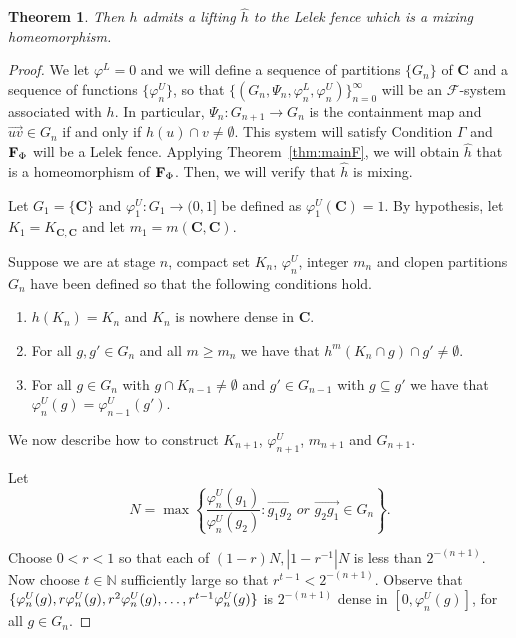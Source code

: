 \documentclass[11pt]{amsart}
\newtheorem{theorem}{Theorem}[section]
\newcommand{\N}{\mathbb{N}}  %
\newcommand{\oa}{\overrightarrow}
\newcommand{\cantor}{\mathbf C}
\newcommand{\fence}{{\bf F}_{\Phi}{}}
\newcommand{\cF}{\mathcal{F}}
\newcommand{\fsystem}{\{(G_n, \Psi_n,\varphi^L_n,\varphi^U_n)\}_{n=0}^{\infty}}
\begin{document}
{\begin{theorem}
Then $h$ admits a lifting $\hat{h}$ to the Lelek fence which is a mixing homeomorphism.
\end{theorem}
\begin{proof}
We let $\varphi^L=0$ and 
    we will define a sequence of partitions $\{G_n\}$  of $\cantor$ and a sequence of functions $\{\varphi^U_n\}$, so that $\fsystem$ will be an  $\cF$-system associated with $h$. In particular, $
    \Psi_n:G_{n+1} \rightarrow G_n$ is the  containment map and $ \oa{uv} \in G_n$ if and only if $h(u) \cap v \neq \emptyset$.  This system will satisfy Condition $\Gamma$ and $\fence$ will be a Lelek fence. Applying Theorem~\ref{thm:mainF}, we will obtain $\hat h$ that is a homeomorphism of $\fence$. Then, we will verify that $\hat{h}$ is mixing.

     Let $G_1= \{\cantor\}$ and $\varphi^U_1:G_1 \rightarrow (0,1]$ be defined as $\varphi^U_1(\cantor) =1$. By hypothesis, let $K_1=K_{\cantor,\cantor}$ and let $m_1 = m(\cantor,\cantor)$.
     
Suppose we are at stage $n$,  compact set $K_n$, $\varphi^U_{n}$, integer $m_n$ and  clopen partitions $G_n$  have been defined so that the following conditions hold.
        \begin{enumerate}[label=(\alph*)]
            \item $h(K_n) = K_n$ and $K_n$ is nowhere dense in $\cantor$.
    \item For all $g, g' \in G_n$ and all $m \ge m_n$ we have that $h^m(K_n \cap g ) \cap g' \neq \emptyset$.
    \item  For all $ g\in G_n$  with $g \cap K_{n-1}  \neq \emptyset$ and $g' \in G_{n-1}$ with $g \subseteq g'$ we have that  $ \varphi^U_{n}(g)= \varphi^U_{n-1}(g')$.
        \end{enumerate}

        We now describe how to construct $K_{n+1}$, $\varphi^U_{n+1}$, $m_{n+1}$ and $G_{n+1}$. 

    
  Let \[  N =  \max  \left \{ \frac{\varphi^U_n(g_1)}{\varphi^U_n(g_2)}: \oa{g_1g_2} \textit { or } \oa{g_2g_1} \in G_n \right \}.\]
    
    Choose $0 < r <1$ so that each of $(1-r)N, |1-r^{-1}|N$ is less than $2^{-(n+1)}$. Now choose $ t \in \N$ sufficiently large so that $r^{t-1}< 2^{-(n+1)}$. Observe that  $\{\varphi^U_n(g), r\varphi^U_n(g), r^2 \varphi^U_n(g), \ldots,\\
    r^{t-1} \varphi^U_n(g)\}$ is $2^{-(n+1)}$ dense in $[0, \varphi^U_n(g)]$, for all $g \in G_n$.


\end{proof}}
\end{document}
